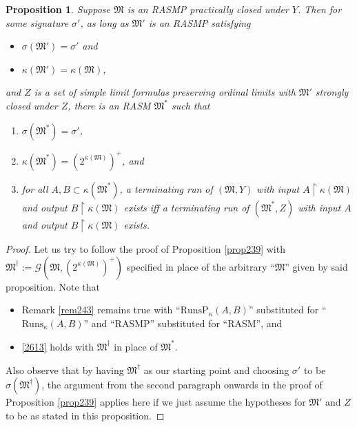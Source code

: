 \documentclass[12pt, twoside]{memoir}
\numberwithin{equation}{section}
\newtheorem{prop}[thm]{Proposition}
\theoremstyle{definition}
\theoremstyle{remark}
\theoremstyle{definition}
\theoremstyle{definition}
\theoremstyle{definition}
\theoremstyle{remark}
\begin{document}
\begin{prop}\label{prop261}
Suppose $\mathfrak{M}$ is an RASMP practically closed under $Y$. Then for some signature $\sigma'$, as long as $\mathfrak{M}'$ is an RASMP satisfying
\begin{itemize}
    \item $\sigma(\mathfrak{M}') = \sigma'$ and
    \item $\kappa(\mathfrak{M}') = \kappa(\mathfrak{M})$,
\end{itemize}
and $Z$ is a set of simple limit formulas preserving ordinal limits with $\mathfrak{M}'$ strongly closed under $Z$, there is an RASM $\mathfrak{M}^*$ such that
\begin{enumerate}[label=(\alph*)]
    \item $\sigma(\mathfrak{M}^*) = \sigma'$,
    \item $\kappa(\mathfrak{M}^*) = (2^{\kappa(\mathfrak{M})})^+$, and
    \item\label{2613} for all $A, B \subset \kappa(\mathfrak{M}^*)$, a terminating run of $(\mathfrak{M}, Y)$ with input $A \restriction \kappa(\mathfrak{M})$ and output $B \restriction \kappa(\mathfrak{M})$ exists iff a terminating run of $(\mathfrak{M}^*, Z)$ with input $A$ and output $B \restriction \kappa(\mathfrak{M})$ exists.
\end{enumerate}
\end{prop}

\begin{proof}
Let us try to follow the proof of Proposition \ref{prop239} with $\mathfrak{M}^{\dagger} := \mathcal{G}(\mathfrak{M}, (2^{\kappa(\mathfrak{M})})^+)$ specified in place of the arbitrary ``$\mathfrak{M}$'' given by said proposition. Note that 
\begin{itemize}
    \item Remark \ref{rem243} remains true with ``$\mathrm{RunsP}_{\kappa}(A, B)$'' substituted for ``$\mathrm{Runs}_{\kappa}(A, B)$'' and ``RASMP'' substituted for ``RASM'', and 
    \item \ref{2613} holds with $\mathfrak{M}^{\dagger}$ in place of $\mathfrak{M}^*$.
\end{itemize}
Also observe that by having $\mathfrak{M}^{\dagger}$ as our starting point and choosing $\sigma'$ to be $\sigma(\mathfrak{M}^{\dagger})$, the argument from the second paragraph onwards in the proof of Proposition \ref{prop239} applies here if we just assume the hypotheses for $\mathfrak{M}'$ and $Z$ to be as stated in this proposition. 
\end{proof}
\end{document}

